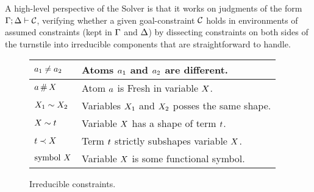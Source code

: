 \documentclass[english, mgr]{iithesis}
\newcommand{\solverRule}{\vdash}
\begin{document}
A high-level perspective of the Solver is that it works on judgments of the form
$\cEnv; \icEnv \solverRule \sconstr$, verifying whether a given goal-constraint $\mathcal{C}$
holds in environments of assumed constraints (kept in $\Gamma$ and $\Delta$)
by dissecting constraints on both sides of the turnstile into
irreducible components that are straightforward to handle.
\begin{figure}
  \centering
  \begin{tabularx}{\textwidth}{|l|X|}
    \hline
    $a_1 \neq a_2$
    & Atoms $a_1$ and $a_2$ are different.
    \\ \hline
    $a   \,\#\, X$
    & Atom $a$ is {Fresh} in variable $X$.
    \\ \hline
    $X_1 \sim  X_2$
    & Variables $X_1$ and $X_2$ posses the same shape.
    \\ \hline
    $X   \sim  t$
    & Variable $X$ has a shape of term $t$.
    \\ \hline
    $t    \prec  X$
    & Term $t$ strictly subshapes variable $X$.
    \\ \hline
    $\text{symbol } X$
    & Variable $X$ is some functional symbol.
    \\ \hline
  \end{tabularx}
  \caption{Irreducible constraints.}
  \label{fig:irreducible-constraints}
\end{figure}
\end{document}
